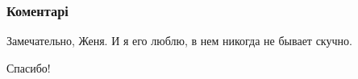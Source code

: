  
 
 
 
 
\subsubsection{Коментарі}
\label{sec:03_08_2021.fb.bilchenko_evgenia.4.gorod_zolotoj.cmt}

\begin{itemize}
 
Замечательно, Женя. И я его люблю, в нем никогда не бывает скучно.

 
Спасибо!
\end{itemize}

